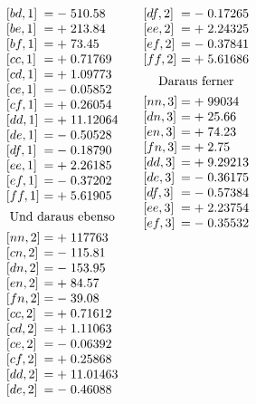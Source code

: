 {\[\begin{array}{@{}l@{\qquad}l@{\qquad}l@{}}
\begin{array}[t]{@{}l@{\;}c@{\;}c@{\;}l@{}}
{[bd,1]}&=&-&510.58\\
{[be,1]}&=&+&213.84\\
{[bf,1]}&=&+&73.45\\
{[cc,1]}&=&+&0.71769\\
{[cd,1]}&=&+&1.09773\\
{[ce,1]}&=&-&0.05852\\
{[cf,1]}&=&+&0.26054\\
{[dd,1]}&=&+&11.12064\\
{[de,1]}&=&-&0.50528\\
{[df,1]}&=&-&0.18790\\
{[ee,1]}&=&+&2.26185\\
{[ef,1]}&=&-&0.37202\\
{[ff,1]}&=&+&5.61905\\[4.5pt]
\multicolumn{4}{@{}c@{}}{\text{Und daraus ebenso}}\\[4.5pt]
{[nn,2]}&=&+&117763\\
{[cn,2]}&=&-&115.81\\
{[dn,2]}&=&-&153.95\\
{[en,2]}&=&+&84.57\\
{[fn,2]}&=&-&39.08\\
{[cc,2]}&=&+&0.71612\\
{[cd,2]}&=&+&1.11063\\
{[ce,2]}&=&-&0.06392\\
{[cf,2]}&=&+&0.25868\\
{[dd,2]}&=&+&11.01463\\
{[de,2]}&=&-&0.46088
\end{array}&
\begin{array}[t]{@{}l@{\;}c@{\;}c@{\;}l@{}}
{[df,2]}&=&-&0.17265\\
{[ee,2]}&=&+&2.24325\\
{[ef,2]}&=&-&0.37841\\
{[ff,2]}&=&+&5.61686\\[5.5pt]
\multicolumn{4}{@{}c@{}}{\text{Daraus ferner}}\\[4pt]
{[nn,3]}&=&+&99034\\
{[dn,3]}&=&+&25.66\\
{[en,3]}&=&+&74.23\\
{[fn,3]}&=&+&2.75\\
{[dd,3]}&=&+&9.29213\\
{[de,3]}&=&-&0.36175\\
{[df,3]}&=&-&0.57384\\
{[ee,3]}&=&+&2.23754\\
{[ef,3]}&=&-&0.35532\\

\end{array}
\end{array}\]}
